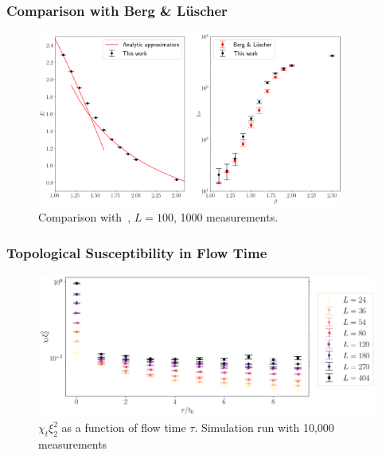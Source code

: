 \documentclass{beamer}
\begin{document}
\begin{frame}
    \frametitle{Comparison with Berg \& L\"uscher}
    \begin{figure}[h!]
        \centering
          \includegraphics[width=0.9\textwidth]{imgs/internal_energy.png}
          \caption{\label{fig:bergluscher}Comparison with~, $L=100$, 1000 measurements.}
    \end{figure}
\end{frame}



\begin{frame}
    \frametitle{Topological Susceptibility in Flow Time}
    \begin{figure}[h!]
        \centering
          \includegraphics[width=\textwidth]{imgs/bietenholz.png}
          \caption{\label{fig:bietenholz} $\chi_t \xi_2^2$ as a  function of flow time $\tau$. Simulation run with 10,000 measurements }
    \end{figure}
\end{frame}
\end{document}
